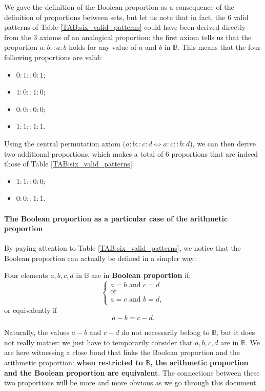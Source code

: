 We gave the definition of the Boolean proportion as a consequence of the
definition of proportions between sets, but let us note that in fact, the $6$
valid patterns of Table \ref{TAB:six_valid_patterns} could have been derived
directly from the $3$ axioms of an analogical proportion: the first axiom tells
us that the proportion $a:b::a:b$ holds for any value of $a$ and $b$ in
$\mathbb{B}$. This means that the four following proportions are valid:
\begin{itemize}
  \item $0 : 1 :: 0 :1$;
  \item $1 : 0 :: 1 :0$;
  \item $0 : 0 :: 0 :0$;
  \item $1 : 1 :: 1 :1$.
\end{itemize}
Using the central permutation axiom $(a:b::c:d \iff a:c::b:d$), we can then
derive two additional proportions, which makes a total of $6$ proportions that
are indeed those of Table \ref{TAB:six_valid_patterns}:
\begin{itemize}
  \item $1 : 1 :: 0 : 0$;
  \item $0 : 0 :: 1 : 1$.
\end{itemize}

\paragraph{The Boolean proportion as a particular case of the arithmetic
proportion\\}

By paying attention to Table \ref{TAB:six_valid_patterns}, we notice that the
Boolean proportion can actually be defined in a simpler way:
\begin{definition}
  \label{DEF:boolean_proportion_informal}
  Four elements $a, b, c, d$ in $\mathbb{B}$ are in \textbf{Boolean proportion} if:
  $$
  \begin{cases}
    a = b \text{ and } c = d\\
    \text{or}\\
    a = c \text{ and } b = d,
  \end{cases}
  $$
  or equivalently if
  $$a - b = c - d.$$
\end{definition}

Naturally, the values $a - b$ and $c -d$ do not necessarily belong to
$\mathbb{B}$, but it does not really matter: we just have to temporarily
consider that $a, b, c, d$ are in $\mathbb{R}$. We are here witnessing a close
bond that links the Boolean proportion and the arithmetic proportion:
\textbf{when restricted to $\mathbb{B}$, the arithmetic proportion and the
Boolean proportion are equivalent}. The connections between these two
proportions will be more and more obvious as we go through this document.

